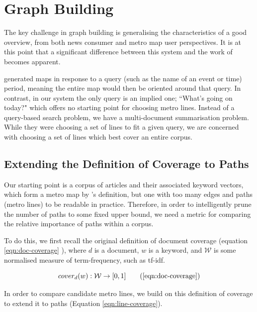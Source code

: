 \clearpage

\section{Graph Building}

The key challenge in graph building is generalising the characteristics of a good overview, from both news consumer and metro map user perspectives. It is at this point that a significant difference between this system and the work of \cite{MetroMapsOfScience, GeneratingInformationMaps, InformationCartographyPre} becomes apparent. 

\citeauthor{GeneratingInformationMaps} generated maps in response to a query (such as the name of an event or time) period, meaning the entire map would then be oriented around that query. In contrast, in our system the only query is an implied one; ``What's going on today?" which offers no starting point for choosing metro lines. Instead of a query-based search problem, we have a multi-document summarisation problem. While they were choosing a set of lines to fit a given query, we are concerned with choosing a set of lines which best cover an entire corpus.

\subsection{Extending the Definition of Coverage to Paths}

Our starting point is a corpus of articles and their associated keyword vectors, which form a metro map by \citeauthor{GeneratingInformationMaps}'s definition, but one with too many edges and paths (metro lines) to be readable in practice. Therefore, in order to intelligently prune the number of paths to some fixed upper bound, we need a metric for comparing the relative importance of paths within a corpus.

To do this, we first recall the original definition of document coverage (equation \ref{eqn:doc-coverage} \citep{GeneratingInformationMaps, MetroMapsOfScience, InformationCartographyPre}), where $d$ is a document, $w$ is a keyword, and $\mathcal{W}$ is some normalised measure of term-frequency, such as tf-idf.

\begin{equation}
	cover_{d}(w) : \mathcal{W} \rightarrow [0,1]
	\tag{\ref{eqn:doc-coverage}}
\end{equation}

In order to compare candidate metro lines, we build on this definition of coverage to extend it to paths (Equation \ref{eqn:line-coverage}).

